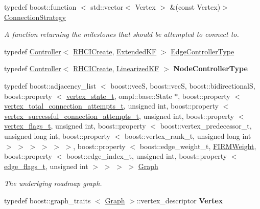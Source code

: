 \begin{DoxyCompactItemize}
\item 
\hypertarget{class_f_i_r_m_a15cfbcaf52c0bdd5e6c1a969bbf7ea1e}{typedef boost\-::function\*
$<$ std\-::vector$<$ \-Vertex $>$\*
 \&(const \-Vertex)$>$ \hyperlink{class_f_i_r_m_a15cfbcaf52c0bdd5e6c1a969bbf7ea1e}{\-Connection\-Strategy}}\label{class_f_i_r_m_a15cfbcaf52c0bdd5e6c1a969bbf7ea1e}

\begin{DoxyCompactList}\small\item\em \-A function returning the milestones that should be attempted to connect to. \end{DoxyCompactList}\item 
typedef \hyperlink{class_controller}{\-Controller}$<$ \hyperlink{class_r_h_c_i_create}{\-R\-H\-C\-I\-Create}, \*
\hyperlink{class_extended_k_f}{\-Extended\-K\-F} $>$ \hyperlink{class_f_i_r_m_a70abcb24fbc9f836b94119f65c8f8a37}{\-Edge\-Controller\-Type}
\item 
\hypertarget{class_f_i_r_m_adf37596ffd4dbf633d7cd0f27347d15c}{typedef \hyperlink{class_controller}{\-Controller}$<$ \hyperlink{class_r_h_c_i_create}{\-R\-H\-C\-I\-Create}, \*
\hyperlink{class_linearized_k_f}{\-Linearized\-K\-F} $>$ {\bfseries \-Node\-Controller\-Type}}\label{class_f_i_r_m_adf37596ffd4dbf633d7cd0f27347d15c}

\item 
typedef boost\-::adjacency\-\_\-list\*
$<$ boost\-::vec\-S, boost\-::vec\-S, \*
boost\-::bidirectional\-S, \*
boost\-::property\*
$<$ \hyperlink{struct_f_i_r_m_1_1vertex__state__t}{vertex\-\_\-state\-\_\-t}, \*
ompl\-::base\-::\-State \*
$\ast$, boost\-::property\*
$<$ \hyperlink{struct_f_i_r_m_1_1vertex__total__connection__attempts__t}{vertex\-\_\-total\-\_\-connection\-\_\-attempts\-\_\-t}, \*
unsigned int, boost\-::property\*
$<$ \hyperlink{struct_f_i_r_m_1_1vertex__successful__connection__attempts__t}{vertex\-\_\-successful\-\_\-connection\-\_\-attempts\-\_\-t}, \*
unsigned int, boost\-::property\*
$<$ \hyperlink{struct_f_i_r_m_1_1vertex__flags__t}{vertex\-\_\-flags\-\_\-t}, unsigned int, \*
boost\-::property\*
$<$ boost\-::vertex\-\_\-predecessor\-\_\-t, \*
unsigned long int, \*
boost\-::property\*
$<$ boost\-::vertex\-\_\-rank\-\_\-t, \*
unsigned long int $>$\*
 $>$ $>$ $>$ $>$ $>$, boost\-::property\*
$<$ boost\-::edge\-\_\-weight\-\_\-t, \*
\hyperlink{class_f_i_r_m_weight}{\-F\-I\-R\-M\-Weight}, boost\-::property\*
$<$ boost\-::edge\-\_\-index\-\_\-t, \*
unsigned int, boost\-::property\*
$<$ \hyperlink{struct_f_i_r_m_1_1edge__flags__t}{edge\-\_\-flags\-\_\-t}, unsigned int $>$ $>$ $>$ $>$ \hyperlink{class_f_i_r_m_a687e9f4243b22c30ee1fa5da22a85053}{\-Graph}
\begin{DoxyCompactList}\small\item\em \-The underlying roadmap graph. \end{DoxyCompactList}\item 
\hypertarget{class_f_i_r_m_a07eb05796ed64797c900b193aafa9031}{typedef boost\-::graph\-\_\-traits\*
$<$ \hyperlink{class_f_i_r_m_a687e9f4243b22c30ee1fa5da22a85053}{\-Graph} $>$\-::vertex\-\_\-descriptor {\bfseries \-Vertex}}\label{class_f_i_r_m_a07eb05796ed64797c900b193aafa9031}


\end{DoxyCompactItemize}
